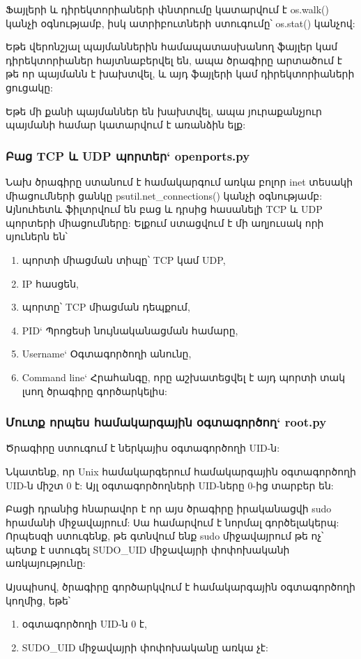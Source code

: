 \documentclass[a4paper,12pt]{article}
\begin{document}
\begin{sloppypar}
Ֆայլերի և դիրեկտորիաների փնտրումը կատարվում է os.walk() կանչի օգնությամբ,
իսկ ատրիբուտների ստուգումը՝ os.stat() կանչով:

Եթե վերոնշյալ պայմաններին համապատասխանող ֆայլեր կամ դիրեկտորիաներ հայտնաբերվել են,
ապա ծրագիրը արտածում է թե որ պայմանն է խախտվել, և այդ ֆայլերի կամ դիրեկտորիաների
ցուցակը:

Եթե մի քանի պայմաններ են խախտվել, ապա յուրաքանչյուր պայմանի համար կատարվում է
առանձին ելք:


\subsubsection{Բաց TCP և UDP պորտեր` openports.py}


Նախ ծրագիրը ստանում է համակարգում առկա բոլոր inet տեսակի միացումների ցանկը
psutil.net\_connections() կանչի օգնությամբ:
Այնուհետև ֆիլտրվում են բաց և դրսից հասանելի TCP և UDP պորտերի միացումները:
Ելքում ստացվում է մի աղյուսակ որի սյուներն են՝

\begin{enumerate}
\item պորտի միացման տիպը՝ TCP կամ UDP,
\item IP հասցեն,
\item պորտը՝ TCP միացման դեպքում,
\item PID` Պրոցեսի նույնականացման համարը,
\item Username` Օգտագործողի անունը,
\item Command line` Հրահանգը, որը աշխատեցվել է այդ պորտի տակ լսող ծրագիրը գործարկելիս:
\end{enumerate}


\subsubsection{Մուտք որպես համակարգային օգտագործող` root.py}


Ծրագիրը ստուգում է ներկայիս օգտագործողի UID-ն:

Նկատենք, որ Unix համակարգերում համակարգային օգտագործողի UID-ն միշտ 0 է:
Այլ օգտագործողների UID-ները 0-ից տարբեր են:

Բացի դրանից հնարավոր է որ այս ծրագիրը իրականացվի sudo հրամանի միջավայրում:
Սա համարվում է նորմալ գործելակերպ: Որպեսզի ստուգենք, թե գտնվում ենք sudo
միջավայրում թե ոչ՝ պետք է ստուգել SUDO\_UID միջավայրի փոփոխականի
առկայությունը:

Այսպիսով, ծրագիրը գործարկվում է համակարգային օգտագործողի կողմից, եթե՝
\begin{enumerate}
\item օգտագործողի UID-ն 0 է,
\item SUDO\_UID միջավայրի փոփոխականը առկա չէ:
\end{enumerate}


\end{sloppypar}
\end{document}
